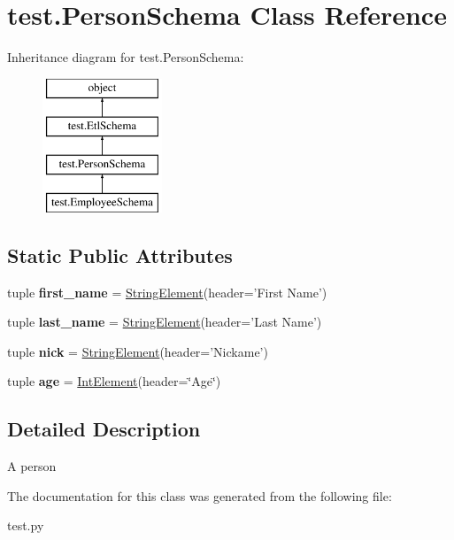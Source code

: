 \hypertarget{classtest_1_1PersonSchema}{\section{test.\-Person\-Schema Class Reference}
\label{classtest_1_1PersonSchema}
}
Inheritance diagram for test.\-Person\-Schema\-:\begin{figure}[H]
\begin{center}
\leavevmode
\includegraphics[height=4.000000cm]{classtest_1_1PersonSchema}
\end{center}
\end{figure}
\subsection*{Static Public Attributes}
\begin{DoxyCompactItemize}
\item 
\hypertarget{classtest_1_1PersonSchema_a0395e207ab7eea84d29d61f4faa7d32a}{tuple {\bfseries first\-\_\-name} = \hyperlink{classtest_1_1StringElement}{String\-Element}(header='First Name')}\label{classtest_1_1PersonSchema_a0395e207ab7eea84d29d61f4faa7d32a}

\item 
\hypertarget{classtest_1_1PersonSchema_a952c639f39920c168c05d204d25cd23d}{tuple {\bfseries last\-\_\-name} = \hyperlink{classtest_1_1StringElement}{String\-Element}(header='Last Name')}\label{classtest_1_1PersonSchema_a952c639f39920c168c05d204d25cd23d}

\item 
\hypertarget{classtest_1_1PersonSchema_a7a0c219bc4f3ac85bf0b5305baa8476c}{tuple {\bfseries nick} = \hyperlink{classtest_1_1StringElement}{String\-Element}(header='Nickame')}\label{classtest_1_1PersonSchema_a7a0c219bc4f3ac85bf0b5305baa8476c}

\item 
\hypertarget{classtest_1_1PersonSchema_adfb19569b4aaae0dff0a983331e5d142}{tuple {\bfseries age} = \hyperlink{classtest_1_1IntElement}{Int\-Element}(header=\char`\"{}Age\char`\"{})}\label{classtest_1_1PersonSchema_adfb19569b4aaae0dff0a983331e5d142}

\end{DoxyCompactItemize}


\subsection{Detailed Description}
\begin{DoxyVerb}A person\end{DoxyVerb}
 

The documentation for this class was generated from the following file\-:\begin{DoxyCompactItemize}
\item 
test.\-py\end{DoxyCompactItemize}
